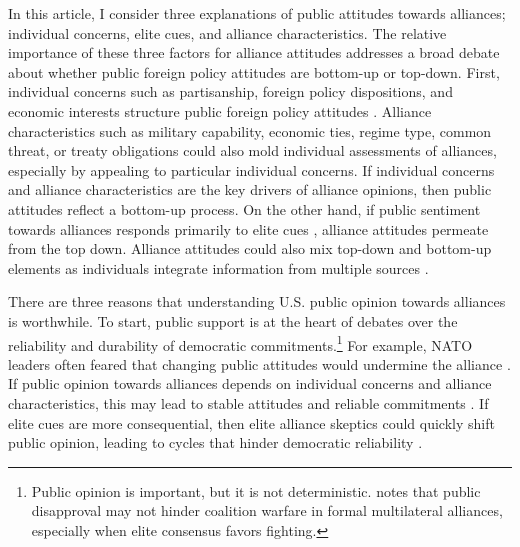 \documentclass[12pt]{article}
\begin{document}
In this article, I consider three explanations of public attitudes towards alliances; individual concerns, elite cues, and alliance characteristics.
The relative importance of these three factors for alliance attitudes addresses a broad debate about whether public foreign policy attitudes are bottom-up or top-down. 
First, individual concerns such as partisanship, foreign policy dispositions, and economic interests structure public foreign policy attitudes \citep{KertzerZeitzoff2017}.
Alliance characteristics such as military capability, economic ties, regime type, common threat, or treaty obligations could also mold individual assessments of alliances, especially by appealing to particular individual concerns. 
If individual concerns and alliance characteristics are the key drivers of alliance opinions, then public attitudes reflect a bottom-up process. 
On the other hand, if public sentiment towards alliances responds primarily to elite cues \citep{Druckman2014}, alliance attitudes permeate from the top down.
Alliance attitudes could also mix top-down and bottom-up elements as individuals integrate information from multiple sources \citep{PageShapiro1992}.  


There are three reasons that understanding U.S. public opinion towards alliances is worthwhile. 
To start, public support is at the heart of debates over the reliability and durability of democratic commitments.\footnote{Public opinion is important, but it is not deterministic. \citet{Kreps2010} notes that public disapproval may not hinder coalition warfare in formal multilateral alliances, especially when elite consensus favors fighting.}
For example, NATO leaders often feared that changing public attitudes would undermine the alliance \citep{Sayle2019}.   
If public opinion towards alliances depends on individual concerns and alliance characteristics, this may lead to stable attitudes and reliable commitments \citep{Gaubatz1996}.
If elite cues are more consequential, then elite alliance skeptics could quickly shift public opinion, leading to cycles that hinder democratic reliability \citep{GartzkeGleditsch2004}.
\end{document}
